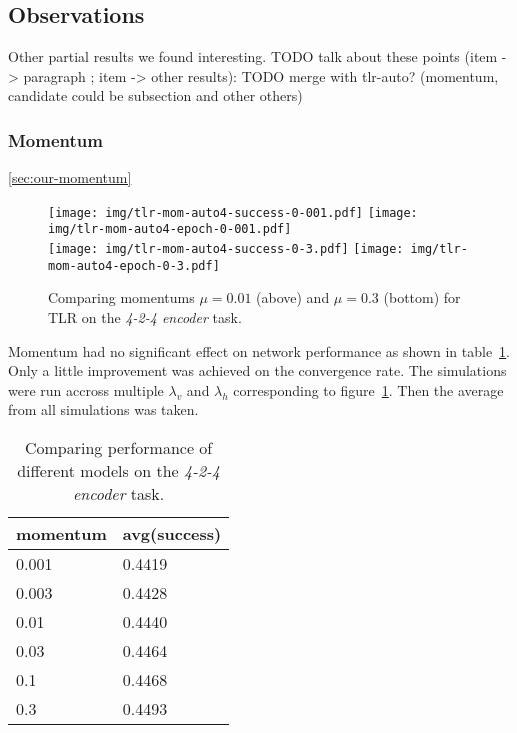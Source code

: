 
\subsection{Observations}
\label{sec:results-other} 

Other partial results we found interesting. 
TODO talk about these points (item -> paragraph ; item -> other results): 
TODO merge with tlr-auto? (momentum, candidate could be subsection and other others) 

 

\subsubsection{Momentum}
\label{sec:results-momentum} 

\ref{sec:our-momentum} 

\begin{figure}[H]
  \centering
  \texttt{[image: img/tlr-mom-auto4-success-0-001.pdf]}  
  \texttt{[image: img/tlr-mom-auto4-epoch-0-001.pdf]}  \\
  \texttt{[image: img/tlr-mom-auto4-success-0-3.pdf]}  
  \texttt{[image: img/tlr-mom-auto4-epoch-0-3.pdf]}  
  \caption{Comparing momentums $\mu=0.01$ (above) and $\mu=0.3$ (bottom) for TLR on the \emph{4-2-4 encoder} task.}
  \label{fig:results-tlr-auto4-momentum}
\end{figure}

Momentum had no significant effect on network performance as shown in table~\ref{tab:results-mom-auto4}. Only a little improvement was achieved on the convergence rate. The simulations were run accross multiple $\lambda_v$ and $\lambda_h$ corresponding to figure~\ref{fig:results-tlr-auto4-momentum}. Then the average from all simulations was taken. 
\begin{table}[H] 
  \centering
  {\small
    \begin{tabular}{|l|l|}
    \hline
momentum & avg(success) \\
    \hline
0.001  & 0.4419 \\
    \hline
0.003  & 0.4428 \\
    \hline
0.01   & 0.4440 \\
    \hline
0.03   & 0.4464 \\
    \hline
0.1    & 0.4468 \\
    \hline
0.3    & 0.4493 \\
    \hline
    \end{tabular}
  }
  \caption{Comparing performance of different models on the \emph{4-2-4 encoder} task.} 
  \label{tab:results-mom-auto4}
\end{table}


 
